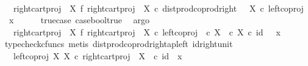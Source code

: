 \begin{isabellebody}
\ \ \isamarkupfalse%
\ \isamarkupfalse%
\ {\isachardoublequoteopen}{\isachardot}{\kern0pt}{\isachardot}{\kern0pt}{\isachardot}{\kern0pt}\ {\isacharequal}{\kern0pt}\ {\isacharparenleft}{\kern0pt}right{\isacharunderscore}{\kern0pt}cart{\isacharunderscore}{\kern0pt}proj\ {\isasymone}\ X\ {\isasymbowtie}\isactrlsub f\ right{\isacharunderscore}{\kern0pt}cart{\isacharunderscore}{\kern0pt}proj\ {\isasymone}\ X{\isacharparenright}{\kern0pt}\ {\isasymcirc}\isactrlsub c\ dist{\isacharunderscore}{\kern0pt}prod{\isacharunderscore}{\kern0pt}coprod{\isacharunderscore}{\kern0pt}right\ {\isasymone}\ {\isasymone}\ X\ {\isasymcirc}\isactrlsub c\ {\isasymlangle}left{\isacharunderscore}{\kern0pt}coproj\ {\isasymone}\ {\isasymone}{\isacharcomma}{\kern0pt}\ x{\isasymrangle}{\isachardoublequoteclose}\isanewline
\ \ \ \ \isamarkupfalse%
\ true{\isacharunderscore}{\kern0pt}case\ case{\isacharunderscore}{\kern0pt}bool{\isacharunderscore}{\kern0pt}true\ \isamarkupfalse%
\ argo\isanewline
\ \ \isamarkupfalse%
\ \isamarkupfalse%
\ {\isachardoublequoteopen}{\isachardot}{\kern0pt}{\isachardot}{\kern0pt}{\isachardot}{\kern0pt}\ {\isacharequal}{\kern0pt}\ {\isacharparenleft}{\kern0pt}right{\isacharunderscore}{\kern0pt}cart{\isacharunderscore}{\kern0pt}proj\ {\isasymone}\ X\ {\isasymbowtie}\isactrlsub f\ right{\isacharunderscore}{\kern0pt}cart{\isacharunderscore}{\kern0pt}proj\ {\isasymone}\ X{\isacharparenright}{\kern0pt}\ {\isasymcirc}\isactrlsub c\ left{\isacharunderscore}{\kern0pt}coproj\ {\isacharparenleft}{\kern0pt}{\isasymone}\ {\isasymtimes}\isactrlsub c\ X{\isacharparenright}{\kern0pt}\ {\isacharparenleft}{\kern0pt}{\isasymone}\ {\isasymtimes}\isactrlsub c\ X{\isacharparenright}{\kern0pt}\ {\isasymcirc}\isactrlsub c\ {\isasymlangle}id\ {\isasymone}\ {\isacharcomma}{\kern0pt}\ x{\isasymrangle}{\isachardoublequoteclose}\isanewline
\ \ \ \ \isamarkupfalse%
\ {\isacharparenleft}{\kern0pt}typecheck{\isacharunderscore}{\kern0pt}cfuncs{\isacharcomma}{\kern0pt}\ metis\ dist{\isacharunderscore}{\kern0pt}prod{\isacharunderscore}{\kern0pt}coprod{\isacharunderscore}{\kern0pt}right{\isacharunderscore}{\kern0pt}ap{\isacharunderscore}{\kern0pt}left\ id{\isacharunderscore}{\kern0pt}right{\isacharunderscore}{\kern0pt}unit{}{\isacharparenright}{\kern0pt}\isanewline
\ \ \isamarkupfalse%
\ \isamarkupfalse%
\ {\isachardoublequoteopen}{\isachardot}{\kern0pt}{\isachardot}{\kern0pt}{\isachardot}{\kern0pt}\ {\isacharequal}{\kern0pt}\ left{\isacharunderscore}{\kern0pt}coproj\ X\ X\ {\isasymcirc}\isactrlsub c\ right{\isacharunderscore}{\kern0pt}cart{\isacharunderscore}{\kern0pt}proj\ {\isasymone}\ X\ \ {\isasymcirc}\isactrlsub c\ {\isasymlangle}id\ {\isasymone}{\isacharcomma}{\kern0pt}\ x{\isasymrangle}{\isachardoublequoteclose}\isanewline

\end{isabellebody}
